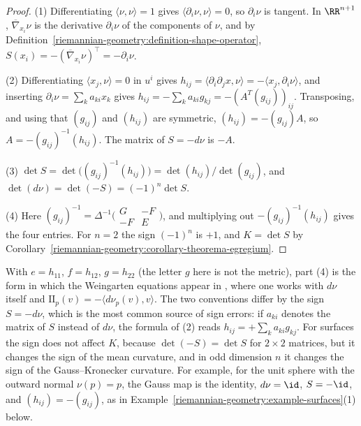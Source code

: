 \begin{proof}
(1) Differentiating $\langle\nu, \nu\rangle = 1$ gives $\langle\partial_i\nu, \nu\rangle = 0$, so $\partial_i\nu$ is tangent. In $\RR^{n+1}$, $\overline{\nabla}_{x_i}\nu$ is the
derivative $\partial_i\nu$ of the components of $\nu$, and by Definition~\ref{riemannian-geometry:definition-shape-operator},
$S(x_i) = -(\overline{\nabla}_{x_i}\nu)^\top = -\partial_i\nu$.

(2) Differentiating $\langle x_j, \nu\rangle = 0$ in $u^i$ gives $h_{ij} = \langle\partial_i\partial_jx, \nu\rangle = -\langle x_j, \partial_i\nu\rangle$, and inserting
$\partial_i\nu = \sum_ka_{ki}x_k$ gives $h_{ij} = -\sum_ka_{ki}g_{kj} = -(A^T(g_{ij}))_{ij}$. Transposing, and using that $(g_{ij})$ and $(h_{ij})$ are symmetric,
$(h_{ij}) = -(g_{ij})A$, so $A = -(g_{ij})^{-1}(h_{ij})$. The matrix of $S = -d\nu$ is $-A$.

(3) $\det S = \det\bigl((g_{ij})^{-1}(h_{ij})\bigr) = \det(h_{ij})/\det(g_{ij})$, and $\det(d\nu) = \det(-S) = (-1)^n\det S$.

(4) Here $(g_{ij})^{-1} = \Delta^{-1}\bigl(\begin{smallmatrix} G & -F\\ -F & E\end{smallmatrix}\bigr)$, and multiplying out $-(g_{ij})^{-1}(h_{ij})$ gives the four entries.
For $n = 2$ the sign $(-1)^n$ is $+1$, and $K = \det S$ by Corollary~\ref{riemannian-geometry:corollary-theorema-egregium}.
\end{proof}

\begin{remark}\label{riemannian-geometry:remark-sign-conventions}
With $e = h_{11}$, $f = h_{12}$, $g = h_{22}$ (the letter $g$ here is not the metric), part (4) is the form in which the Weingarten equations appear in
\cite[Chapter 3]{do-carmo-curves-surfaces}, where one works with $d\nu$ itself and $\mathrm{II}_p(v) = -\langle d\nu_p(v), v\rangle$. The two conventions differ by the
sign $S = -d\nu$, which is the most common source of sign errors: if $a_{ki}$ denotes the matrix of $S$ instead of $d\nu$, the formula of (2) reads
$h_{ij} = +\sum_ka_{ki}g_{kj}$. For surfaces the sign does not affect $K$, because $\det(-S) = \det S$ for $2 \times 2$ matrices, but it changes the sign of the mean
curvature, and in odd dimension $n$ it changes the sign of the Gauss--Kronecker curvature. For example, for the unit sphere with the outward normal $\nu(p) = p$, the Gauss map
is the identity, $d\nu = \id$, $S = -\id$, and $(h_{ij}) = -(g_{ij})$, as in Example~\ref{riemannian-geometry:example-surfaces}(1) below.
\end{remark}

